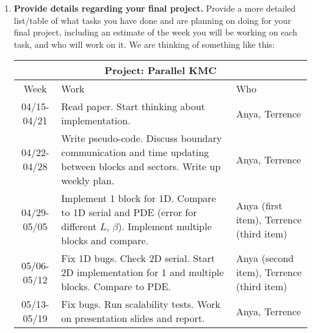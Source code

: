 \documentclass[12pt]{article}
\begin{document}
\begin{enumerate}
\item {\bf Provide details regarding your final project.}
  Provide a more detailed list/table of what tasks you have done and are planning on
  doing for your final project, including an estimate of the  week
  you will be working on each task, and who will work on it. We are
  thinking of something like this:
  \begin{center}
  \begin{tabular} {|c|p{9cm}|p{2cm}|}
    \hline
    \multicolumn{3}{|c|}{\bf Project: Parallel KMC} \\
    \hline
    Week & Work & Who  \\ \hline \hline
    04/15-04/21 & Read paper.  Start thinking about
    implementation. & Anya, Terrence \\ \hline
    04/22-04/28 & Write pseudo-code.  Discuss boundary communication and time updating between blocks and sectors.
    Write up weekly plan. & Anya, Terrence \\ \hline
    04/29-05/05 & Implement 1 block for 1D.  Compare to 1D serial and PDE (error for different $L$, $\beta$). Implement multiple blocks and compare.  & Anya (first item), Terrence (third item)  \\ \hline
    05/06-05/12 & Fix 1D bugs.  Check 2D serial.  Start 2D implementation for 1 and multiple blocks.  Compare to PDE. & Anya (second item), Terrence (third item) \\ \hline
    05/13-05/19 & Fix bugs.  Run scalability tests. Work on
    presentation slides and report.  & Anya, Terrence \\ \hline
  \end{tabular}
  \end{center}



\end{enumerate}
\end{document}
